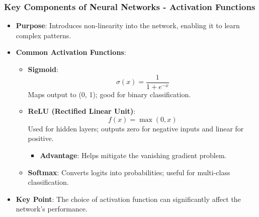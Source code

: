\documentclass[aspectratio=169]{beamer}
\begin{document}
\begin{frame}[fragile]
    \frametitle{Key Components of Neural Networks - Activation Functions}
    \begin{itemize}
        \item \textbf{Purpose}: Introduces non-linearity into the network, enabling it to learn complex patterns.
        \item \textbf{Common Activation Functions}:
        \begin{itemize}
            \item \textbf{Sigmoid}:
                \begin{equation}
                    \sigma(x) = \frac{1}{1 + e^{-x}}
                \end{equation}
                Maps output to (0, 1); good for binary classification.
            \item \textbf{ReLU (Rectified Linear Unit)}:
                \begin{equation}
                    f(x) = \max(0, x)
                \end{equation}
                Used for hidden layers; outputs zero for negative inputs and linear for positive.
                \begin{itemize}
                    \item \textbf{Advantage}: Helps mitigate the vanishing gradient problem.
                \end{itemize}
            \item \textbf{Softmax}: Converts logits into probabilities; useful for multi-class classification.
        \end{itemize}
        \item \textbf{Key Point}: The choice of activation function can significantly affect the network’s performance.
    \end{itemize}
\end{frame}
\end{document}
